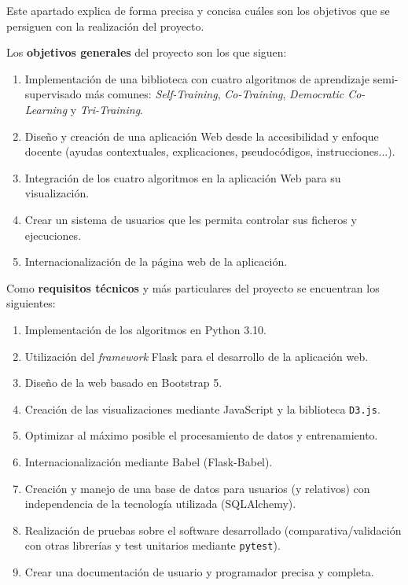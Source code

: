 
Este apartado explica de forma precisa y concisa cuáles son los objetivos que se
persiguen con la realización del proyecto.


Los \textbf{objetivos generales} del proyecto son los que siguen:
\begin{enumerate}
    \item Implementación de una biblioteca con cuatro algoritmos de aprendizaje
    semi-supervisado más comunes: \emph{Self-Training}, \emph{Co-Training},
    \emph{Democratic Co-Learning} y \emph{Tri-Training}.
    \item Diseño y creación de una aplicación Web desde la accesibilidad y
    enfoque docente (ayudas contextuales, explicaciones, pseudocódigos,
    instrucciones...).
    \item Integración de los cuatro algoritmos en la aplicación Web para su
    visualización.
    \item Crear un sistema de usuarios que les permita controlar sus ficheros y ejecuciones.
    \item Internacionalización de la página web de la aplicación.
\end{enumerate}

Como \textbf{requisitos técnicos} y más particulares del proyecto se encuentran
los siguientes:

\begin{enumerate}
    \item Implementación de los algoritmos en Python 3.10.
    \item Utilización del \emph{framework} Flask para el desarrollo de la
    aplicación web.
    \item Diseño de la web basado en Bootstrap 5.
    \item Creación de las visualizaciones mediante JavaScript y la biblioteca
    \texttt{D3.js}.
    \item Optimizar al máximo posible el procesamiento de datos y entrenamiento.
    \item Internacionalización mediante Babel (Flask-Babel).
    \item Creación y manejo de una base de datos para usuarios (y relativos) con
    independencia de la tecnología utilizada (SQLAlchemy).
    \item Realización de pruebas sobre el software desarrollado
    (comparativa/validación con otras librerías y test unitarios mediante
    \texttt{pytest}).
    \item Crear una documentación de usuario y programador precisa y completa.
\end{enumerate}